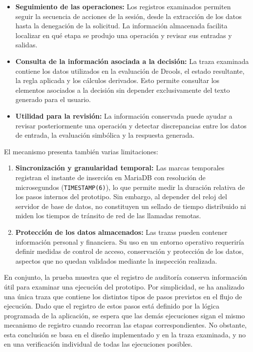 \documentclass[12pt,a4paper]{report}
\begin{document}
\begin{itemize}
    \item \textbf{Seguimiento de las operaciones:} Los registros examinados permiten seguir la secuencia de acciones de la sesión, desde la extracción de los datos hasta la denegación de la solicitud. La información almacenada facilita localizar en qué etapa se produjo una operación y revisar sus entradas y salidas.

    \item \textbf{Consulta de la información asociada a la decisión:} La traza examinada contiene los datos utilizados en la evaluación de Drools, el estado resultante, la regla aplicada y los cálculos derivados. Esto permite consultar los elementos asociados a la decisión sin depender exclusivamente del texto generado para el usuario.

    \item \textbf{Utilidad para la revisión:} La información conservada puede ayudar a revisar posteriormente una operación y detectar discrepancias entre los datos de entrada, la evaluación simbólica y la respuesta generada.
\end{itemize}

El mecanismo presenta también varias limitaciones:

\begin{enumerate}
    \item \textbf{Sincronización y granularidad temporal:} Las marcas temporales registran el instante de inserción en MariaDB con resolución de microsegundos (\texttt{TIMESTAMP(6)}), lo que permite medir la duración relativa de los pasos internos del prototipo. Sin embargo, al depender del reloj del servidor de base de datos, no constituyen un sellado de tiempo distribuido ni miden los tiempos de tránsito de red de las llamadas remotas.

    \item \textbf{Protección de los datos almacenados:} Las trazas pueden contener información personal y financiera. Su uso en un entorno operativo requeriría definir medidas de control de acceso, conservación y protección de los datos, aspectos que no quedan validados mediante la inspección realizada.
\end{enumerate}

En conjunto, la prueba muestra que el registro de auditoría conserva información útil para examinar una ejecución del prototipo. Por simplicidad, se ha analizado una única traza que contiene los distintos tipos de pasos previstos en el flujo de ejecución. Dado que el registro de estos pasos está definido por la lógica programada de la aplicación, se espera que las demás ejecuciones sigan el mismo mecanismo de registro cuando recorran las etapas correspondientes. No obstante, esta conclusión se basa en el diseño implementado y en la traza examinada, y no en una verificación individual de todas las ejecuciones posibles.
\end{document}
